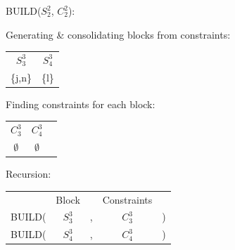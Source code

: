 \documentclass[11pt]{article} %
\begin{document}
	\hspace{0.5cm}BUILD($S_2^2$, $C_2^2$):
		\begin{center}
		Generating \& consolidating blocks from constraints:
		
		\begin{tabular}{c c}
			\hspace{0.8cm}$S_3^3$\hspace{0.8cm} & \hspace{0.8cm}$S_4^3$\hspace{0.8cm} \\
			\{j,n\} & \{l\}
		\end{tabular}
	
		Finding constraints for each block:
		
		\begin{tabular}{c c c}
			\hspace{0.8cm}$C_3^3$\hspace{0.8cm} & \hspace{0.8cm}$C_4^3$\hspace{0.8cm} \\
			$\emptyset$ & $\emptyset$
		\end{tabular}

		Recursion:
		
		\begin{tabular}{c c c c c}
			 & Block & & Constraints & \\
			BUILD( & $S_3^3$ & , & $C_3^3$ & ) \\
			BUILD( & $S_4^3$ & , & $C_4^3$ & )
		\end{tabular}
		\end{center}
\end{document}

